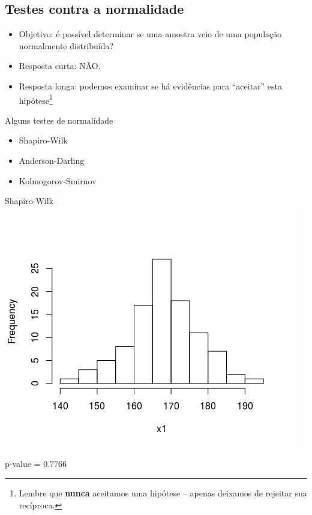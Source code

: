 \documentclass{beamer}
\begin{document}
\subsection[Normalidade]{Testes contra a normalidade}

\begin{frame}
  \begin{itemize}
  \item Objetivo: é possível \alert{determinar} se uma amostra veio de uma população normalmente distribuída?
  \item Resposta curta: \alert<3->{NÃO}.
  \item<4> Resposta longa: podemos examinar se há evidências para ``aceitar'' esta hipótese\footnote{Lembre que {\bf nunca} aceitamos uma hipótese -- apenas deixamos de rejeitar sua recíproca.}
  \end{itemize}
\end{frame}

\begin{frame}{Alguns testes de normalidade}
  \begin{itemize}
  \item<1-> \alert<2>{Shapiro-Wilk}
  \item<1-> Anderson-Darling
  \item<1-> Kolmogorov-Smirnov
  \end{itemize}
\end{frame}

\begin{frame}{Shapiro-Wilk}
  \centering
  \includegraphics[width=.8\textwidth]{Nao_Param/normal1-h}

  p-value = 0.7766
\end{frame}
\end{document}
